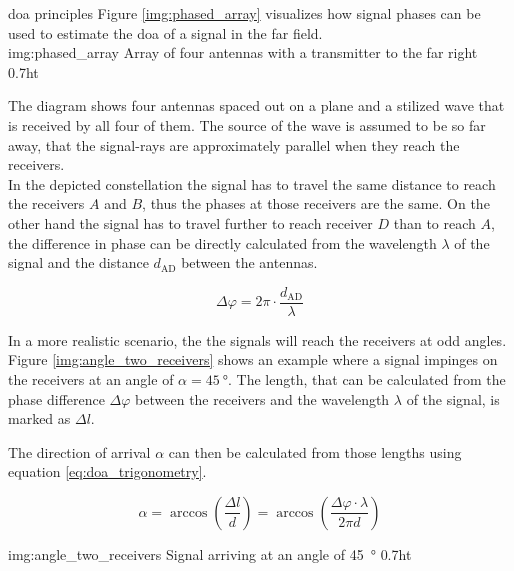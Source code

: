 \begin{subchapter}{\gls{doa} principles}
  Figure \ref{img:phased_array} visualizes how signal phases
  can be used to estimate the \acrlong{doa} of a signal
  in the far field. \\

               {img:phased_array}
               {Array of four antennas with a transmitter to the far right}
               {0.7}{ht}

  The diagram shows four antennas spaced out on a plane
  and a stilized wave that is received by all four of them.
  The source of the wave is assumed to be so far away, that
  the signal-rays are approximately parallel when
  they reach the receivers. \\

  In the depicted constellation the signal has to travel the
  same distance to reach the receivers $A$ and $B$, thus the
  phases at those receivers are the same.
  On the other hand the signal has to travel further to reach
  receiver $D$ than to reach $A$, the difference in phase can
  be directly calculated from the wavelength $\lambda$ of the
  signal and the distance $d_\text{AD}$ between the antennas.

  \begin{equation*}
    \Delta \varphi =  2 \pi \cdot \frac{d_\text{AD}}{\lambda}
  \end{equation*}

  In a more realistic scenario, the the signals will reach the
  receivers at odd angles. Figure \ref{img:angle_two_receivers}
  shows an example where a signal impinges on the receivers at an
  angle of $\alpha=\SI{45}{\degree}$. The length, that can be calculated
  from the phase difference $\Delta \varphi$ between the receivers and
  the wavelength $\lambda$ of the signal, is marked as $\Delta l$.

  The direction of arrival $\alpha$ can then be calculated from
  those lengths using equation \ref{eq:doa_trigonometry}.

  \begin{equation}
    \label{eq:doa_trigonometry}
    \alpha
    = \arccos \left( \frac{\Delta l}{d} \right)
    = \arccos \left( \frac{\Delta \varphi \cdot \lambda}{2 \pi d} \right)
  \end{equation}

               {img:angle_two_receivers}
               {Signal arriving at an angle of \SI{45}{\degree}}
               {0.7}{ht}
\end{subchapter}

